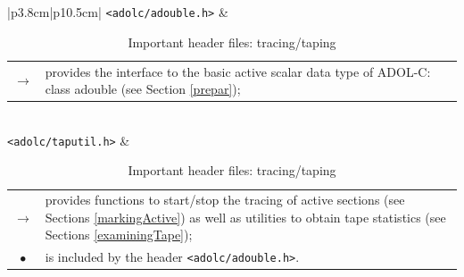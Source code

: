 \documentclass[11pt,twoside]{article}
\begin{document}
\begin{table}[h]
\center \small
\begin{tabular}{|p{3.8cm}|p{10.5cm}|}\hline
\verb=<adolc/adouble.h>= & 
\begin{tabular*}{10.5cm}{cp{9.5cm}}
  \boldmath $\rightarrow$ \unboldmath
                & provides the interface to the basic active 
                  scalar data type of ADOL-C: {\sf class adouble} 
                  (see Section \ref{prepar}); 
\end{tabular*}
\\ \hline
 \verb=<adolc/taputil.h>= & 
\begin{tabular*}{10.5cm}{cp{9.5cm}}
  \boldmath $\rightarrow$ \unboldmath
                & provides functions to start/stop the tracing of
                  active sections (see Sections \ref{markingActive})
                  as well as utilities to obtain 
                  tape statistics (see Sections \ref{examiningTape}); \\
  $\bullet$     & is included by the header \verb=<adolc/adouble.h>=.
\end{tabular*}
\\ \hline
\end{tabular}
\caption{Important header files: tracing/taping}
\label{importantHeaders1}
\end{table}  
%
\end{document}
